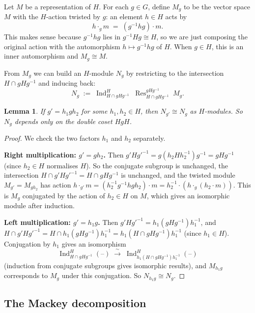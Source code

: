 \documentclass[12pt,a4paper]{article}
\newtheorem{lemma}[theorem]{Lemma}
\theoremstyle{definition}
\theoremstyle{remark}
\newcommand{\Ind}{\operatorname{Ind}}
\newcommand{\Res}{\operatorname{Res}}
\begin{document}
Let $M$ be a representation of $H$. For each $g \in G$, define $M_g$
to be the vector space $M$ with the $H$-action twisted by $g$: an
element $h \in H$ acts by
\[
  h \cdot_g m \;=\; (g^{-1}hg) \cdot m.
\]
This makes sense because $g^{-1}hg$ lies in $g^{-1}Hg \cong H$, so
we are just composing the original action with the automorphism
$h \mapsto g^{-1}hg$ of $H$. When $g \in H$, this is an inner
automorphism and $M_g \cong M$.

From $M_g$ we can build an $H$-module $N_g$ by restricting to the
intersection $H \cap gHg^{-1}$ and inducing back:
\[
  N_g \;:=\; \Ind_{H \cap gHg^{-1}}^{H}\;
  \Res_{H \cap gHg^{-1}}^{gHg^{-1}}\; M_g.
\]

\begin{lemma}\label{lem:Ng-well-defined}
If $g' = h_1 g h_2$ for some $h_1, h_2 \in H$, then
$N_{g'} \cong N_g$ as $H$-modules. So $N_g$ depends only on the
double coset $HgH$.
\end{lemma}

\begin{proof}
We check the two factors $h_1$ and $h_2$ separately.

\medskip\noindent\textbf{Right multiplication: $g' = gh_2$.}
Then $g'Hg'^{-1} = g(h_2 H h_2^{-1})g^{-1} = gHg^{-1}$ (since
$h_2 \in H$ normalises $H$). So the conjugate subgroup is unchanged,
the intersection $H \cap g'Hg'^{-1} = H \cap gHg^{-1}$ is unchanged,
and the twisted module $M_{g'} = M_{gh_2}$ has action
$h \cdot_{g'} m = (h_2^{-1} g^{-1} h g h_2) \cdot m
= h_2^{-1} \cdot (h \cdot_g (h_2 \cdot m))$.
This is $M_g$ conjugated by the action of $h_2 \in H$ on $M$, which
gives an isomorphic module after induction.

\medskip\noindent\textbf{Left multiplication: $g' = h_1 g$.}
Then $g'Hg'^{-1} = h_1(gHg^{-1})h_1^{-1}$, and
$H \cap g'Hg'^{-1} = H \cap h_1(gHg^{-1})h_1^{-1}
= h_1(H \cap gHg^{-1})h_1^{-1}$ (since $h_1 \in H$). Conjugation by
$h_1$ gives an isomorphism
\[
  \Ind_{H \cap gHg^{-1}}^{H}(\text{--})
  \;\xrightarrow{\;\sim\;}\;
  \Ind_{h_1(H \cap gHg^{-1})h_1^{-1}}^{H}(\text{--})
\]
(induction from conjugate subgroups gives isomorphic results), and
$M_{h_1 g}$ corresponds to $M_g$ under this conjugation. So
$N_{h_1 g} \cong N_g$.
\end{proof}

\subsection{The Mackey decomposition}
\end{document}
